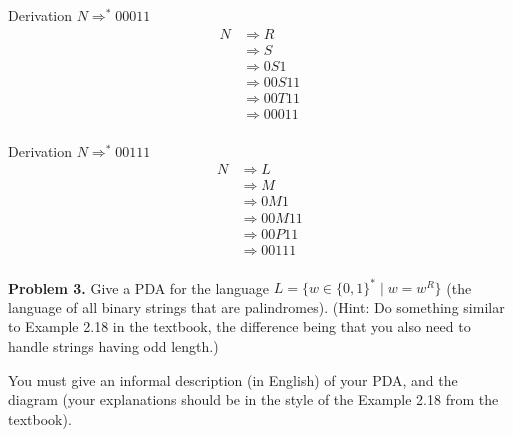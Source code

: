 \documentclass[12pt,letterpaper,final]{report}
\begin{document}
\noindent
\begin{minipage}[t]{0.45\textwidth}
  \vspace{0pt}
  Derivation $N \Rightarrow^* 00011$
  \begin{align*}
    N & \Rightarrow R     \\
      & \Rightarrow S     \\
      & \Rightarrow 0S1   \\
      & \Rightarrow 00S11 \\
      & \Rightarrow 00T11 \\
      & \Rightarrow 00011 \\
  \end{align*}
\end{minipage}%
\hfill
\begin{minipage}[t]{0.45\textwidth}
  \vspace{0pt}
  Derivation $N \Rightarrow^* 00111$
  \begin{align*}
    N & \Rightarrow L     \\
      & \Rightarrow M     \\
      & \Rightarrow 0M1   \\
      & \Rightarrow 00M11 \\
      & \Rightarrow 00P11 \\
      & \Rightarrow 00111 \\
  \end{align*}
\end{minipage}

\pagebreak

\textbf{Problem 3.}   Give a PDA for the language $L = \{w \in \{0,1\}^* \mid w = w^R\}$ (the language of all binary strings that are palindromes). (Hint: Do something similar to Example 2.18 in the textbook, the difference being that you also need to handle strings having odd length.)

You must give an informal description (in English) of your PDA, and the diagram (your explanations should be in the style of the Example 2.18 from the textbook).
\end{document}
